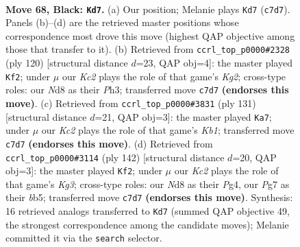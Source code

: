 \documentclass[11pt]{article}
\begin{document}
\clearpage

\begin{figure}[p]\centering
\begin{subfigure}{0.46\textwidth}\centering
\resizebox{\linewidth}{!}{%
\newchessgame
\chessboard[
  setfen={3n4/2k3p1/1p4p1/p1pp4/8/1PP5/K7/8 b - - 0 68},
  showmover=false,
  pgfstyle=straightmove, color=movearrow, markmove={c7-d7}
]}
\caption{}
\end{subfigure}\hfill
\begin{subfigure}{0.46\textwidth}\centering
\resizebox{\linewidth}{!}{%
\newchessgame
\chessboard[
  setfen={4k3/5p2/7p/1p2p1p1/1P2P1P1/5P1P/6K1/8 w - - 27 61},
  showmover=false,
  pgfstyle=straightmove, color=movearrow, markmove={g2-f2}
]}
\caption{}
\end{subfigure}
\\[4pt]
\begin{subfigure}{0.46\textwidth}\centering
\resizebox{\linewidth}{!}{%
\newchessgame
\chessboard[
  setfen={1k6/2p5/1p1p2p1/1P1P2P1/P7/5K2/8/8 b - - 4 66},
  showmover=false,
  pgfstyle=straightmove, color=movearrow, markmove={b8-a7}
]}
\caption{}
\end{subfigure}\hfill
\begin{subfigure}{0.46\textwidth}\centering
\resizebox{\linewidth}{!}{%
\newchessgame
\chessboard[
  setfen={8/8/4k2B/1b2p3/p5P1/P4PK1/1P6/8 w - - 39 72},
  showmover=false,
  pgfstyle=straightmove, color=movearrow, markmove={g3-f2}
]}
\caption{}
\end{subfigure}
\caption{\textbf{Move 68, Black: \texttt{Kd7}.} (a) Our position; Melanie plays \texttt{Kd7} (\texttt{c7d7}). Panels (b)--(d) are the retrieved master positions whose correspondence most drove this move (highest QAP objective among those that transfer to it). (b) Retrieved from \texttt{ccrl\_top\_p0000\#2328} (ply 120) [structural distance $d$=23, QAP obj=4]: the master played \texttt{Kf2}; under $\mu$ our \emph{Kc2} plays the role of that game's \emph{Kg2}; cross-type roles: our \emph{N}d8 as their \emph{P}h3; transferred move \texttt{c7d7} \textbf{(endorses this move)}. (c) Retrieved from \texttt{ccrl\_top\_p0000\#3831} (ply 131) [structural distance $d$=21, QAP obj=3]: the master played \texttt{Ka7}; under $\mu$ our \emph{Kc2} plays the role of that game's \emph{Kb1}; transferred move \texttt{c7d7} \textbf{(endorses this move)}. (d) Retrieved from \texttt{ccrl\_top\_p0000\#3114} (ply 142) [structural distance $d$=20, QAP obj=3]: the master played \texttt{Kf2}; under $\mu$ our \emph{Kc2} plays the role of that game's \emph{Kg3}; cross-type roles: our \emph{N}d8 as their \emph{P}g4, our \emph{P}g7 as their \emph{b}b5; transferred move \texttt{c7d7} \textbf{(endorses this move)}. Synthesis: 16 retrieved analogs transferred to \texttt{Kd7} (summed QAP objective 49, the strongest correspondence among the candidate moves); Melanie committed it via the \texttt{search} selector.}
\label{fig:thought-m135}
\end{figure}
\end{document}
